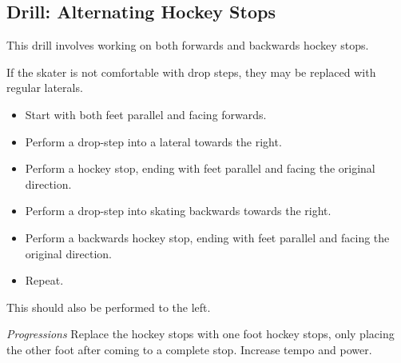 \subsection*{Drill: Alternating Hockey Stops}
\label{drill:footwork/alternating_hockeys}

This drill involves working on both forwards and backwards hockey stops.

If the skater is not comfortable with drop steps, they may be replaced with regular laterals.

\begin{itemize}
\item Start with both feet parallel and facing forwards.
\item Perform a drop-step into a lateral towards the right.
\item Perform a hockey stop, ending with feet parallel and facing the original direction.
\item Perform a drop-step into skating backwards towards the right.
\item Perform a backwards hockey stop, ending with feet parallel and facing the original direction. 
\item Repeat.
\end{itemize}

This should also be performed to the left.

{\it Progressions}
Replace the hockey stops with one foot hockey stops, only placing the other foot after coming to a complete stop.
Increase tempo and power.

